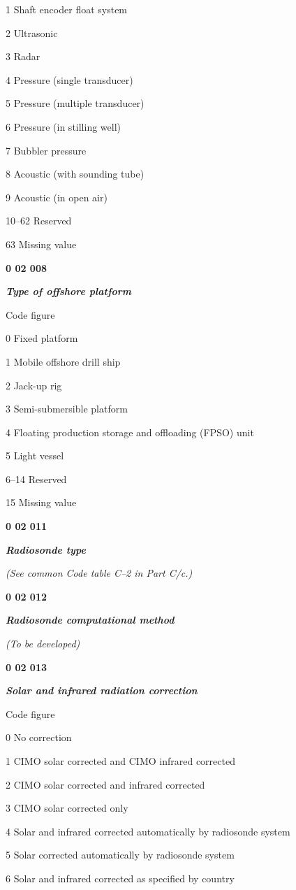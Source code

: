 1 Shaft encoder float system

2 Ultrasonic

3 Radar

4 Pressure (single transducer)

5 Pressure (multiple transducer)

6 Pressure (in stilling well)

7 Bubbler pressure

8 Acoustic (with sounding tube)

9 Acoustic (in open air)

10--62 Reserved

63 Missing value

\textbf{0 02 008}

\emph{\textbf{Type of offshore platform}}

Code figure

0 Fixed platform

1 Mobile offshore drill ship

2 Jack-up rig

3 Semi-submersible platform

4 Floating production storage and offloading (FPSO) unit

5 Light vessel

6--14 Reserved

15 Missing value

\textbf{0 02 011}

\emph{\textbf{Radiosonde type}}

\emph{(See common Code table C--2 in Part C/c.)}

\textbf{0 02 012}

\emph{\textbf{Radiosonde computational method}}

\emph{(To be developed)}

\textbf{0 02 013}

\emph{\textbf{Solar and infrared radiation correction}}

Code figure

0 No correction

1 CIMO solar corrected and CIMO infrared corrected

2 CIMO solar corrected and infrared corrected

3 CIMO solar corrected only

4 Solar and infrared corrected automatically by radiosonde system

5 Solar corrected automatically by radiosonde system

6 Solar and infrared corrected as specified by country

